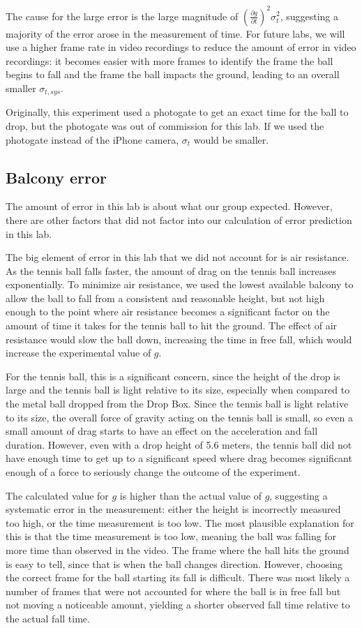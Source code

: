 \documentclass[12pt]{article}
\begin{document}
The cause for the large error is the large magnitude of \(\left(\frac{\partial g}{\partial t}\right)^{2}\sigma_{t}^2\), suggesting a majority of the error arose in the measurement of time. For future labs, we will use a higher frame rate in video recordings to reduce the amount of error in video recordings: it becomes easier with more frames to identify the frame the ball begins to fall and the frame the ball impacts the ground, leading to an overall smaller \(\sigma_{t,sys}\).

Originally, this experiment used a photogate to get an exact time for the ball to drop, but the photogate was out of commission for this lab. If we used the photogate instead of the iPhone camera, \(\sigma_t\) would be smaller.
\subsection{Balcony error}
\label{sec:org77d4c8b}

The amount of error in this lab is about what our group expected. However, there are other factors that did not factor into our calculation of error prediction in this lab.

The big element of error in this lab that we did not account for is air resistance. As the tennis ball falls faster, the amount of drag on the tennis ball increases exponentially. To minimize air resistance, we used the lowest available balcony to allow the ball to fall from a consistent and reasonable height, but not high enough to the point where air resistance becomes a significant factor on the amount of time it takes for the tennis ball to hit the ground. The effect of air resistance would slow the ball down, increasing the time in free fall, which would increase the experimental value of \(g\).

For the tennis ball, this is a significant concern, since the height of the drop is large and the tennis ball is light relative to its size, especially when compared to the metal ball dropped from the Drop Box. Since the tennis ball is light relative to its size, the overall force of gravity acting on the tennis ball is small, so even a small amount of drag starts to have an effect on the acceleration and fall duration. However, even with a drop height of 5.6 meters, the tennis ball did not have enough time to get up to a significant speed where drag becomes significant enough of a force to seriously change the outcome of the experiment.

The calculated value for \(g\) is higher than the actual value of \(g\), suggesting a systematic error in the measurement: either the height is incorrectly measured too high, or the time measurement is too low. The most plausible explanation for this is that the time measurement is too low, meaning the ball was falling for more time than observed in the video. The frame where the ball hits the ground is easy to tell, since that is when the ball changes direction. However, choosing the correct frame for the ball starting its fall is difficult. There was most likely a number of frames that were not accounted for where the ball is in free fall but not moving a noticeable amount, yielding a shorter observed fall time relative to the actual fall time.
\end{document}
